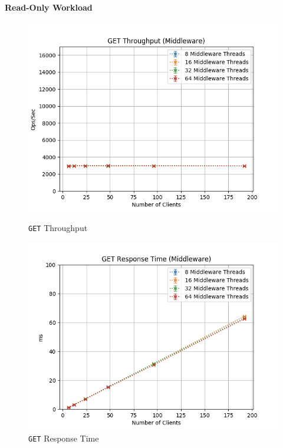 \documentclass[11pt,a4paper]{article}
\begin{document}
\paragraph{Read-Only Workload}
%
\begin{figure}[H]
	\centering
    \begin{minipage}{0.5\textwidth}
        \centering
        \includegraphics[width=\textwidth]{../illustrations/plots/2_2_two_middlewares/0-1/middleware_get_tp_s.png}
        \caption{\texttt{GET} Throughput}
        \label{fig:two_middlewares_get_tp_mw}
    \end{minipage}\hfill
    \begin{minipage}{0.5\textwidth}
        \centering
        \includegraphics[width=\textwidth]{../illustrations/plots/2_2_two_middlewares/0-1/middleware_get_rt_ms.png}
        \caption{\texttt{GET} Response Time}
        \label{fig:two_middlewares_get_rt_mw}
    \end{minipage}
\end{figure}
\end{document}
